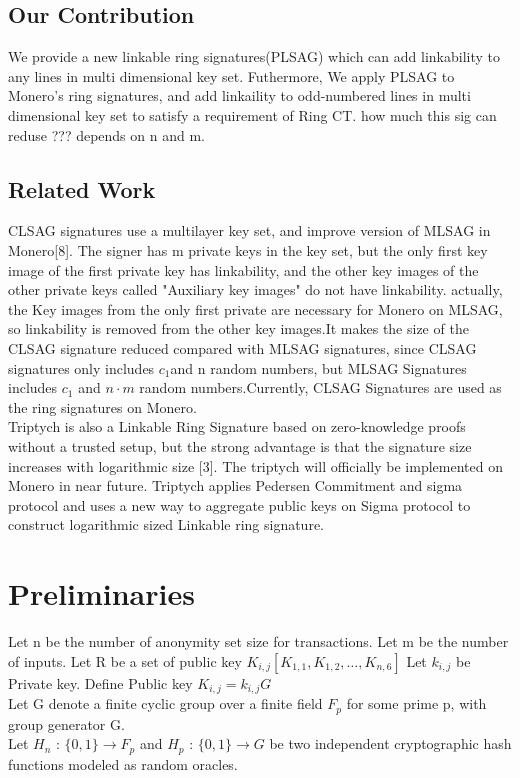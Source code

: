 \documentclass[letterpaper,10pt]{article}
\begin{document}
\subsection{Our Contribution}
We provide a new linkable ring signatures(PLSAG) which can add linkability to any lines in multi dimensional key set. Futhermore, We apply PLSAG to Monero's ring signatures, and add linkaility to odd-numbered lines in multi dimensional key set to satisfy a requirement of Ring CT. how much this sig can reduse ??? depends on n and m.


\subsection{Related Work}
CLSAG signatures use a multilayer key set, and improve version of MLSAG in Monero[8].
The signer has m private keys in the key set, but the only first key image of the first private key has linkability,
and the other key images of the other private keys called "Auxiliary key images" do not have linkability.
actually, the Key images from the only first private are necessary for Monero on MLSAG, so linkability is removed from the other key images.It makes the size of the CLSAG signature reduced compared with MLSAG signatures,
since CLSAG signatures only includes $c_{1}$and n random numbers, but MLSAG Signatures includes $c_{1}$ and $n\cdot m$ random numbers.Currently, CLSAG Signatures are used as the ring signatures on Monero.\\
Triptych is also a Linkable Ring Signature based on zero-knowledge proofs without a trusted setup, but the strong advantage is that the signature size increases with logarithmic size [3].
The triptych will officially be implemented on Monero in near future.  
Triptych applies Pedersen Commitment and sigma protocol and uses a new way to aggregate public keys on Sigma protocol to construct logarithmic sized Linkable ring signature.

\section{Preliminaries}
Let n be the number of anonymity set size for transactions. Let m be the number of inputs. 
Let R be a set of public key $K_{i,j} [K_{1,1},K_{1,2},\ldots,K_{n,6}]$
Let $k_{i,j}$ be Private key. Define Public key $K_{i,j}=k_{i,j}G$\\
Let G denote a finite cyclic group over a finite field $F_p$ for some prime p, with group generator G.\\
Let $H_n$ : $ \{0,1 \} \rightarrow F_p$ and $H_p$ : $ \{0,1 \} \rightarrow G$ be two independent cryptographic
hash functions modeled as random oracles.
\end{document}

